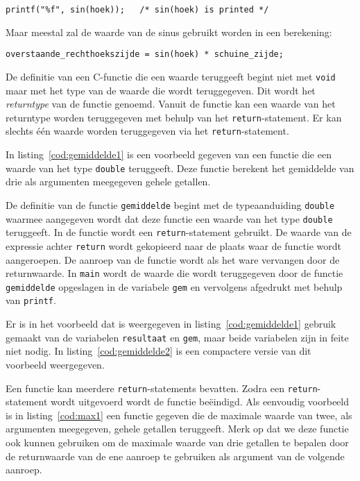 \hspace*{1em}\texttt{printf("\%f", sin(hoek)); \ \ /* sin(hoek) is printed */}

Maar meestal zal de waarde van de sinus gebruikt worden in een berekening:

\hspace*{1em}\texttt{overstaande\_rechthoekszijde = sin(hoek) * schuine\_zijde;}

De definitie van een C-functie die een waarde teruggeeft begint niet met \texttt{void} maar met het type van de waarde die wordt teruggegeven.
Dit wordt het \textsl{returntype} van de functie genoemd.
Vanuit de functie kan een waarde van het returntype worden teruggegeven met behulp van het \texttt{return}-statement. Er kan slechts één waarde worden teruggegeven via het \texttt{return}-statement.

In listing~\ref{cod:gemiddelde1} is een voorbeeld gegeven van een functie die een waarde van het type \texttt{double} teruggeeft.
Deze functie berekent het gemiddelde van drie als argumenten meegegeven gehele getallen.
  

De definitie van de functie \texttt{gemiddelde} begint met de typeaanduiding \texttt{double} waarmee aangegeven wordt dat deze functie een waarde van het type \texttt{double} teruggeeft.
In de functie wordt een \texttt{return}-statement gebruikt.
De waarde van de expressie achter \texttt{return} wordt gekopieerd naar de plaats waar de functie wordt aangeroepen.
De aanroep van de functie wordt als het ware vervangen door de returnwaarde.
In \texttt{main} wordt de waarde die wordt teruggegeven door de functie \texttt{gemiddelde} opgeslagen in de variabele \texttt{gem} en vervolgens afgedrukt met behulp van \texttt{printf}.

Er is in het voorbeeld dat is weergegeven in listing~\ref{cod:gemiddelde1} gebruik gemaakt van de variabelen \texttt{resultaat} en \texttt{gem}, maar beide variabelen zijn in feite niet nodig.
In listing~\ref{cod:gemiddelde2} is een compactere versie van dit voorbeeld weergegeven.


Een functie kan meerdere \texttt{return}-statements bevatten. 
Zodra een \texttt{return}-statement wordt uitgevoerd wordt de functie beëindigd.
Als eenvoudig voorbeeld is in listing~\ref{cod:max1} een functie gegeven die de maximale waarde van twee, als argumenten meegegeven, gehele getallen teruggeeft.
Merk op dat we deze functie ook kunnen gebruiken om de maximale waarde van drie getallen te bepalen door de returnwaarde van de ene aanroep te gebruiken als argument van de volgende aanroep. 

